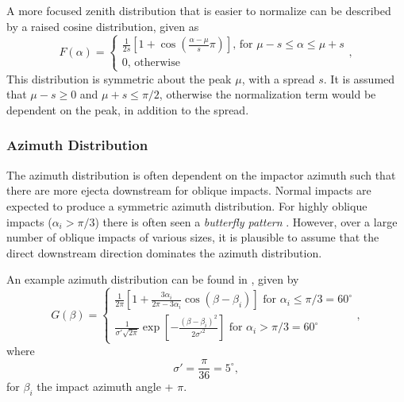 \documentclass{article}
\begin{document}
A more focused zenith distribution that is easier to normalize can be described by a raised cosine distribution, given as
\begin{equation}\label{eq:zenith-rasied cosine dist}
F(\alpha) = \begin{cases}
\frac{1}{2s}\left[1 + \cos\left(\frac{\alpha-\mu}{s}\pi\right)\right] \text{, for $\mu-s \le \alpha \le \mu+s$}\\
0 \text{, otherwise}
\end{cases},
\end{equation}
This distribution is symmetric about the peak $\mu$, with a spread $s$. It is assumed that $\mu-s \ge 0$ and $\mu+s \le \pi/2$, otherwise the normalization term would be dependent on the peak, in addition to the spread.

\subsubsection{Azimuth Distribution}\label{sssec:Ejecta:Azimuth Distribution}

The azimuth distribution is often dependent on the impactor azimuth such that there are more ejecta downstream for oblique impacts. Normal impacts are expected to produce a symmetric azimuth distribution. For highly oblique impacts ($\alpha_i > \pi/3$) there is often seen a \textit{butterfly pattern} \citep{shuvalov2011ejecta}. However, over a large number of oblique impacts of various sizes, it is plausible to assume that the direct downstream direction dominates the azimuth distribution.

An example azimuth distribution can be found in \cite{rival1999modeling}, given by
\begin{equation}\label{eq:azm_rival_mandeville}
G(\beta) =
\begin{cases}
\frac{1}{2\pi}\left[1+\frac{3\alpha_i}{2\pi - 3\alpha_i}\cos(\beta-\beta_i)\right] \text{  for $\alpha_i\le \pi/3 = 60^\circ$}\\
\frac{1}{\sigma'\sqrt{2\pi}}\exp\left[-\frac{(\beta-\beta_i)^2}{2\sigma'^2}\right]
\text{  for $\alpha_i > \pi/3 = 60^\circ$}
\end{cases},
\end{equation}
where
\begin{equation}
\sigma' = \frac{\pi}{36} = 5^\circ, 
\end{equation}
for $\beta_i$ the impact azimuth angle + $\pi$.
\end{document}
